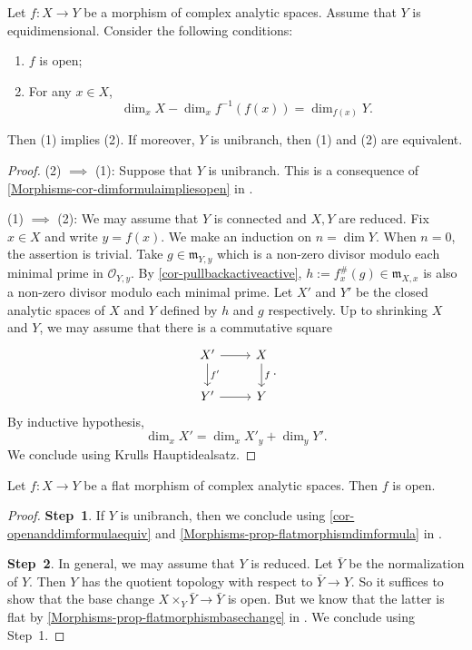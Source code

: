 \begin{corollary}\label{cor-openanddimformulaequiv}
    Let $f:X\rightarrow Y$ be a morphism of complex analytic spaces. Assume that $Y$ is equidimensional. Consider the following conditions:
    \begin{enumerate}
        \item $f$ is open;
        \item For any $x\in X$,
        \[
            \dim_x X-\dim_x f^{-1}(f(x))= \dim_{f(x)}Y.
        \] 
    \end{enumerate}
    Then (1) implies (2). If moreover, $Y$ is unibranch, then (1) and (2) are equivalent.
\end{corollary}
\begin{proof}
    (2) $\implies$ (1): Suppose that $Y$ is unibranch.
    This is a consequence of \cref{Morphisms-cor-dimformulaimpliesopen}  in .

    (1) $\implies$ (2):
    We may assume that $Y$ is connected and $X,Y$ are reduced. Fix $x\in X$ and write $y=f(x)$.
    We make an induction on $n=\dim Y$. When $n=0$, the assertion is trivial. Take $g\in \mathfrak{m}_{Y,y}$ which is a non-zero divisor modulo each minimal prime in $\mathcal{O}_{Y,y}$. By \cref{cor-pullbackactiveactive}, $h:=f_x^{\#}(g)\in \mathfrak{m}_{X,x}$ is also a non-zero divisor modulo each minimal prime.
    Let $X'$ and $Y'$ be the closed analytic spaces of $X$ and $Y$ defined by $h$ and $g$ respectively. Up to shrinking $X$ and $Y$, we may assume that there is a commutative square
    \[
        \begin{tikzcd}
            X' \arrow[r] \arrow[d, "f'"] & X \arrow[d, "f"] \\
            Y' \arrow[r]                 & Y               
        \end{tikzcd}.  
    \]
    By inductive hypothesis, 
    \[
        \dim_x X'=\dim_x X'_y+\dim_y Y'.  
    \]
    We conclude using Krulls Hauptidealsatz.
\end{proof}

\begin{corollary}
    Let $f:X\rightarrow Y$ be a flat morphism of complex analytic spaces. Then $f$ is open.
\end{corollary}
\begin{proof}
    \textbf{Step~1}.
    If $Y$ is unibranch, then we conclude using \cref{cor-openanddimformulaequiv} and \cref{Morphisms-prop-flatmorphismdimformula}  in . 
    
    \textbf{Step~2}.
    In general, we may assume that $Y$ is reduced. Let $\bar{Y}$ be the normalization of $Y$. Then $Y$ has the quotient topology with respect to $\bar{Y}\rightarrow Y$. So it suffices to show that the base change $X\times_Y \bar{Y}\rightarrow \bar{Y}$ is open. But we know that the latter is flat by \cref{Morphisms-prop-flatmorphismbasechange}  in . We conclude using Step~1.
\end{proof}



